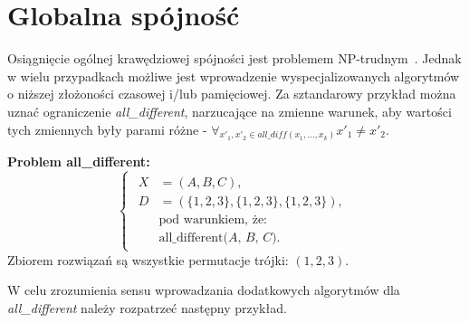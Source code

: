 \section{Globalna spójność}
\par
Osiągnięcie ogólnej krawędziowej spójności jest problemem NP-trudnym~\cite{HandbookOfCP}. Jednak w wielu
przypadkach możliwe jest wprowadzenie wyspecjalizowanych algorytmów o niższej złożoności czasowej i/lub
pamięciowej. Za sztandarowy przykład można uznać ograniczenie \textit{all\_different}, narzucające na zmienne warunek, aby
wartości tych zmiennych były parami różne - $\forall_{x'_1, x'_2 \in all\_diff(x_1,...,x_k)} x'_1 \neq x'_2$.
\begin{example}
\textbf{Problem all\_different:}
\begin{equation}
    \begin{cases}
        \begin{aligned}
            X &= (A, B, C), \\
            D &= (\{1, 2, 3\}, \{1, 2, 3\}, \{1, 2, 3\}), \\
            &\text{pod warunkiem, że:} \\
            &\text{all\_different($A$, $B$, $C$).}
        \end{aligned}
    \end{cases}
\end{equation}
Zbiorem rozwiązań są wszystkie permutacje trójki: $(1, 2, 3)$.
\par
\end{example}
W celu zrozumienia sensu wprowadzania dodatkowych algorytmów dla \textit{all\_different} należy rozpatrzeć następny przykład.
